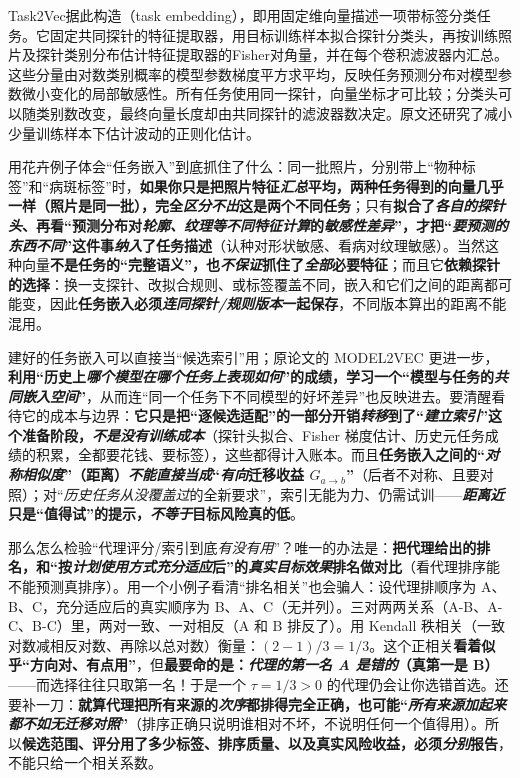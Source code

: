 Task2Vec据此构造（task embedding），即用固定维向量描述一项带标签分类任务。它固定共同探针的特征提取器，用目标训练样本拟合探针分类头，再按训练照片及探针类别分布估计特征提取器的Fisher对角量，并在每个卷积滤波器内汇总。这些分量由对数类别概率的模型参数梯度平方求平均，反映任务预测分布对模型参数微小变化的局部敏感性。所有任务使用同一探针，向量坐标才可比较；分类头可以随类别数改变，最终向量长度却由共同探针的滤波器数决定。原文还研究了减小少量训练样本下估计波动的正则化估计。

用花卉例子体会“任务嵌入”到底抓住了什么：同一批照片，分别带上“物种标签”和“病斑标签”时，\textbf{如果你只是把照片特征\emph{汇总}平均，两种任务得到的向量几乎一样（照片是同一批），完全\emph{区分不出}这是两个不同任务}；只有\textbf{拟合了\emph{各自的探针头}、再看“预测分布对\emph{轮廓、纹理等不同特征计算}的\emph{敏感性差异}”，才把“\emph{要预测的东西\emph{不同}}”这件事\emph{纳入}了任务描述}（认种对形状敏感、看病对纹理敏感）。当然这种向量\textbf{不是任务的“完整语义”，也\emph{不保证}抓住了\emph{全部}必要特征}；而且它\textbf{依赖探针的选择}：换一支探针、改拟合规则、或标签覆盖不同，嵌入和它们之间的距离都可能变，因此\textbf{任务嵌入必须\emph{连同探针/规则版本}一起保存}，不同版本算出的距离不能混用。

建好的任务嵌入可以直接当“候选索引”用；原论文的 MODEL2VEC 更进一步，\textbf{利用“历史上\emph{哪个模型在哪个任务上表现如何}”的成绩，学习一个“模型与任务的\emph{共同嵌入空间}”}，从而连“同一个任务下不同模型的好坏差异”也反映进去。要清醒看待它的成本与边界：\textbf{它只是把“逐候选适配”的一部分开销\emph{转移}到了“\emph{建立索引}”这个准备阶段，\emph{不是没有训练成本}}（探针头拟合、Fisher 梯度估计、历史元任务成绩的积累，全都要花钱、要标签），这些都得计入账本。而且\textbf{任务嵌入之间的“\emph{对称相似度}”（距离）\emph{不能直接当成}“\emph{有向}迁移收益 $G_{a\to b}$”}（后者不对称、且要对照）；对“\emph{历史任务从没覆盖过}的全新要求”，索引无能为力、仍需试训——\textbf{\emph{距离近}只是“值得试”的提示，\emph{不等于}目标风险真的低}。

那么怎么检验“代理评分/索引到底\emph{有没有用}”？唯一的办法是：\textbf{把代理给出的排名，和“按\emph{计划使用方式}\emph{充分适应}后”的\emph{真实目标效果}排名做对比}（看代理排序能不能预测真排序）。用一个小例子看清“排名相关”也会骗人：设代理排顺序为 A、B、C，充分适应后的真实顺序为 B、A、C（无并列）。三对两两关系（A-B、A-C、B-C）里，两对一致、一对相反（A 和 B 排反了）。用 Kendall 秩相关（一致对数减相反对数、再除以总对数）衡量：$(2-1)/3=1/3$。这个正相关\textbf{看着似乎“方向对、有点用”}，但\textbf{最要命的是：\emph{代理的\emph{第一名} A 是错的}（真第一是 B）}——而选择往往只取第一名！于是一个 $\tau=1/3>0$ 的代理仍会让你选错首选。还要补一刀：\textbf{就算代理把所有来源的\emph{次序}都排得完全正确，也可能“\emph{所有来源加起来都不如\emph{无迁移对照}}”}（排序正确只说明谁相对不坏，不说明任何一个值得用）。所以\textbf{候选范围、评分用了多少标签、排序质量、以及真实风险收益，必须\emph{分别}报告}，不能只给一个相关系数。

